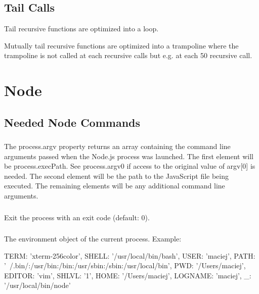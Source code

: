 \subsection{Tail Calls}

Tail recursive functions are optimized into a loop.

Mutually tail recursive functions are optimized into a trampoline where the
trampoline is not called at each recursive calls but e.g. at each 50 recursive
call.









\section{Node}


\subsection{Needed Node Commands}

\subsubsection{}

The process.argv property returns an array containing the command line
arguments passed when the Node.js process was launched. The first element will
be process.execPath. See process.argv0 if access to the original value of
argv[0] is needed. The second element will be the path to the JavaScript file
being executed. The remaining elements will be any additional command line
arguments.



\subsubsection{}

Exit the process with an exit code (default: 0).

\subsubsection{}

The environment object of the current process. Example:
\begin{js}
  {
    TERM: 'xterm-256color',
    SHELL: '/usr/local/bin/bash',
    USER: 'maciej',
    PATH: '~/.bin/:/usr/bin:/bin:/usr/sbin:/sbin:/usr/local/bin',
    PWD: '/Users/maciej',
    EDITOR: 'vim',
    SHLVL: '1',
    HOME: '/Users/maciej',
    LOGNAME: 'maciej',
    _: '/usr/local/bin/node'
  }
\end{js}

